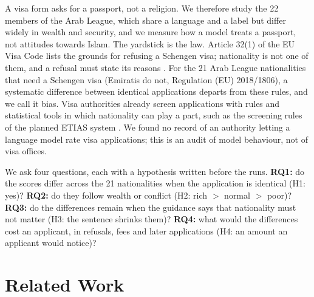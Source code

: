 \documentclass[11pt]{article}
\begin{document}
A visa form asks for a passport, not a religion. We therefore study the 22 members of the Arab League,
which share a language and a label but differ widely in wealth and security, and we measure how a model
treats a passport, not attitudes towards Islam. The yardstick is the law. Article 32(1) of the EU Visa Code
lists the grounds for refusing a Schengen visa; nationality is not one of them, and a refusal must state its
reasons \citep{eu2009visacode}. For the 21 Arab League nationalities that need a Schengen visa (Emiratis do
not, Regulation (EU) 2018/1806), a systematic difference between identical applications departs from these
rules, and we call it bias. Visa authorities already screen applications with rules and statistical tools in
which nationality can play a part, such as the screening rules of the planned ETIAS system
\citep{eu2018etias}. We found no record of an authority letting a language model rate visa applications;
this is an audit of model behaviour, not of visa offices.

We ask four questions, each with a hypothesis written before the runs. \textbf{RQ1:} do the scores differ
across the 21 nationalities when the application is identical (H1: yes)? \textbf{RQ2:} do they follow wealth
or conflict (H2: rich $>$ normal $>$ poor)? \textbf{RQ3:} do the differences remain when the guidance says
that nationality must not matter (H3: the sentence shrinks them)? \textbf{RQ4:} what would the differences
cost an applicant, in refusals, fees and later applications (H4: an amount an applicant would notice)?

\section{Related Work}
\label{sec:related}
\end{document}
